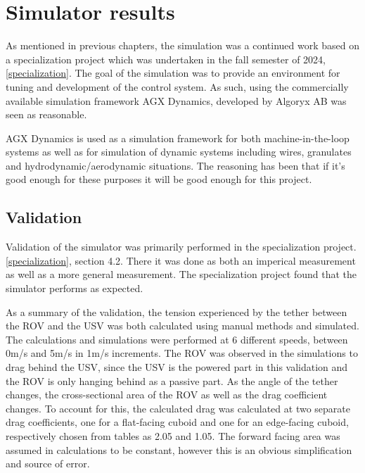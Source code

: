\documentclass[class=article, crop=false]{standalone}
\begin{document}
\section{Simulator results}
As mentioned in previous chapters, the simulation was a continued work based on a specialization project which was undertaken in the fall semester of 2024, \cref{specialization}. The goal of the simulation was to provide an environment for tuning and development of the control system. As such, using the commercially available simulation framework AGX Dynamics, developed by Algoryx AB was seen as reasonable.

AGX Dynamics is used as a simulation framework for both machine-in-the-loop systems as well as for simulation of dynamic systems including wires, granulates and hydrodynamic/aerodynamic situations. The reasoning has been that if it's good enough for these purposes it will be good enough for this project.

\subsection{Validation}
Validation of the simulator was primarily performed in the specialization project. \cref{specialization}, section 4.2. There it was done as both an imperical measurement as well as a more general measurement. The specialization project found that the simulator performs as expected.

As a summary of the validation, the tension experienced by the tether between the ROV and the USV was both calculated using manual methods and simulated. The calculations and simulations were performed at 6 different speeds, between 0m/s and 5m/s in 1m/s increments. The ROV was observed in the simulations to drag behind the USV, since the USV is the powered part in this validation and the ROV is only hanging behind as a passive part. As the angle of the tether changes, the cross-sectional area of the ROV as well as the drag coefficient changes. To account for this, the calculated drag was calculated at two separate drag coefficients, one for a flat-facing cuboid and one for an edge-facing cuboid, respectively chosen from tables as 2.05 and 1.05. The forward facing area was assumed in calculations to be constant, however this is an obvious simplification and source of error.
\end{document}

